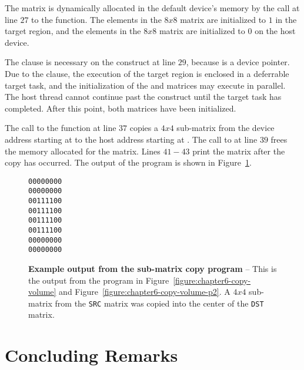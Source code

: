 The  matrix is dynamically allocated in the default device's memory
by the call at line $27$ to the  function.  
The elements in the $8x8$  matrix are initialized to $1$ in the target region,
and the elements in the $8x8$  matrix are initialized to $0$ on the host device.

The  clause is necessary on the  construct 
at line $29$, because  is a device pointer.
Due to the  clause, the execution of the target region is enclosed
in a deferrable target task, and
the initialization of the  and  matrices may execute in parallel.
The host thread cannot continue past the  construct until the target task
has completed.  After this point, both matrices have been initialized.

The call to the function  at line $37$ copies a $4x4$ sub-matrix
from the device address starting at  to the host address starting at .  The call to
 at line $39$ frees the memory allocated for the 
matrix.  Lines $41-43$ print the  matrix after the copy has occurred.  The output of the program is
shown in Figure~\ref{figure:chapter6-copy-volume-output}.

\begin{figure*}[!tb]
\begin{verbatim}
00000000
00000000
00111100
00111100
00111100
00111100
00000000
00000000
\end{verbatim}
\caption{ \textbf {Example output from the sub-matrix copy program } -- \small
          This is the output from the program in Figure~\ref{figure:chapter6-copy-volume}
          and Figure~\ref{figure:chapter6-copy-volume-p2}.
          A $4x4$ sub-matrix from the \texttt{SRC} matrix was copied into the center of the \texttt{DST} matrix.
         }
\label{figure:chapter6-copy-volume-output}
\end{figure*}

\section{Concluding Remarks}
\label{sec:06.summary}

